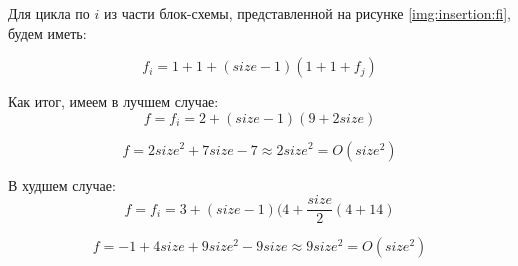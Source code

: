 \documentclass[12pt]{report}
\begin{document}
Для цикла по $i$ из части блок-схемы, представленной на рисунке \ref{img:insertion:fi}, будем иметь:

\begin{equation}
f_{i} = 1 + 1 + (size - 1)(1 + 1 + f_{j})
\end{equation}

Как итог, имеем в лучшем случае:
\begin{equation}
f = f_{i} = 2 + (size - 1)(9 + 2size)
\end{equation}

\begin{equation}
f = 2{size}^2 + 7size - 7 \approx 2{size}^2 = O({size^2})
\end{equation}

В худшем случае:
\begin{equation}
f = f_{i} = 3 + (size-1)(4 + \frac{size}{2}(4 + 14)
\end{equation}

\begin{equation}
f = -1 + 4size + 9{size}^2 - 9size \approx 9{size^2} = O({size}^2)
\end{equation}
\end{document}
